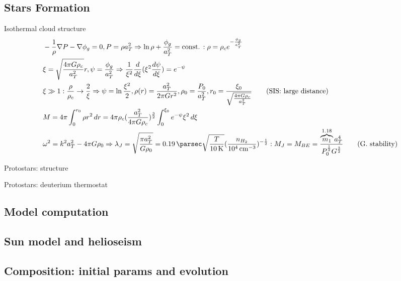 \subsection{Stars Formation}

\begin{frame}{Isothermal cloud structure}
    \begin{align*}
        &-\frac{1}{\rho}\nabla P-\nabla\phi_g=0, P=\rho a_T^2\Rightarrow \ln{\rho}+\frac{\phi_g}{a_T^2}=\const{}:\rho=\rho_c\exp{-\frac{\phi_g}{a_T^2}}\\
        &\xi=\sqrt{\frac{4\pi G\rho_c}{a_T^2}}r, \psi=\frac{\phi_g}{a_T^2}\Rightarrow \frac{1}{\xi^2}\TDof{\xi}(\xi^2\TDy{\xi}{\psi})=\exp{-\psi}\\
        &\xi\gg1: \frac{\rho}{\rho_c}\to \frac{2}{\xi}\Rightarrow \psi=\ln{\frac{\xi^2}{2}}, \rho(r)=\frac{a_T^2}{2\pi Gr^2},\rho_0=\frac{P_0}{a_T^2}, r_0=\frac{\xi_0}{\sqrt{\frac{4\pi G\rho_c}{a_T^2}}}\tag{SIS: large distance}\\
        &M=4\pi\int_0^{r_0}\rho r^2\,dr= 4\pi\rho_c(\frac{a_T^2}{4\pi G\rho_c})^{\frac{3}{2}}\int_0^{\xi_0}\exp{-\psi}\xi^2\,d\xi\\
        &\omega^2=k^2a_T^2-4\pi G\rho_0\Rightarrow \lambda_J=\sqrt{\frac{\pi a_T^2}{G\rho_0}}=\SI{0.19}{\parsec}\sqrt{\frac{T}{\SI{10}{\kelvin}}}(\frac{n_{H_2}}{\SI{e4}{\per\cubic\cm}})^{-\frac{1}{2}}: M_J=M_{BE}=\frac{\overbrace{m_1}^{1.18} a_T^4}{P_0^{\frac{1}{2}}G^{\frac{3}{2}}}\tag{G. stability}
    \end{align*}
\end{frame}

\begin{frame}{Protostars: structure}
    
\end{frame}

\begin{frame}{Protostars: deuterium thermostat}
    
\end{frame}

\subsection{Model computation}

 \subsection{Sun model and helioseism}

\subsection{Composition: initial params and evolution}

